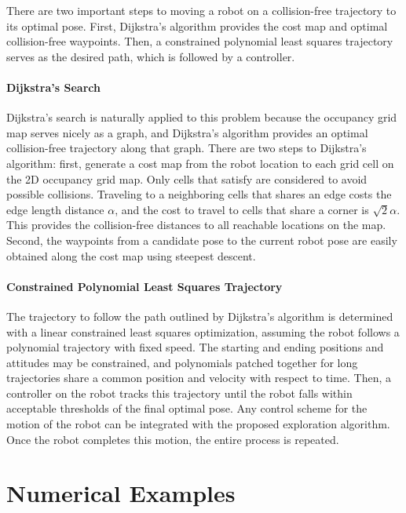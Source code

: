 There are two important steps to moving a robot on a collision-free trajectory to its optimal pose. First, Dijkstra's algorithm provides the cost map and optimal collision-free waypoints. Then, a constrained polynomial least squares trajectory serves as the desired path, which is followed by a controller.

\paragraph{Dijkstra's Search}

Dijkstra's search is naturally applied to this problem because the occupancy grid map serves nicely as a graph, and Dijkstra's algorithm provides an optimal collision-free trajectory along that graph. There are two steps to Dijkstra's algorithm: first, generate a cost map from the robot location to each grid cell on the 2D occupancy grid map. Only cells that satisfy  are considered to avoid possible collisions. Traveling to a neighboring cells that shares an edge costs the edge length distance $\alpha$, and the cost to travel to cells that share a corner is $\sqrt{2}\alpha$. This provides the collision-free distances to all reachable locations on the map. Second, the waypoints from a candidate pose to the current robot pose are easily obtained along the cost map using steepest descent. 


\paragraph{Constrained Polynomial Least Squares Trajectory} The trajectory to follow the path outlined by Dijkstra's algorithm is determined with a linear constrained least squares optimization, assuming the robot follows a polynomial trajectory with fixed speed. The starting and ending positions and attitudes may be constrained, and polynomials patched together for long trajectories share a common position and velocity with respect to time. Then, a controller on the robot tracks this trajectory until the robot falls within acceptable thresholds of the final optimal pose. Any control scheme for the motion of the robot can be integrated with the proposed exploration algorithm. Once the robot completes this motion, the entire process is repeated. 

\section{Numerical Examples}


